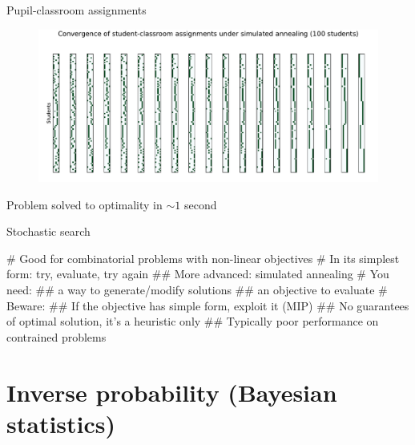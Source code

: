 \documentclass[12pt, aspectratio=149]{beamer}
\theoremstyle{plain}
\begin{document}
\begin{frame}[fragile]{Pupil-classroom assignments}
\vspace*{-1.5em}
\begin{center}
 \begin{figure}
    	\centering
    	\includegraphics[width=0.99\linewidth]{figures/classroom_convergence.pdf}
 \end{figure}
 \end{center}
\vspace*{-2em}
\begin{center}
Problem solved to optimality in $\sim 1$ second
\end{center}
\end{frame}


\begin{frame}[fragile]{Stochastic search}
	\begin{easylist}[itemize]
		# Good for combinatorial problems with non-linear objectives
		# In its simplest form: try, evaluate, try again
		## More advanced: simulated annealing
		# You need: 
		## a way to generate/modify solutions
		## an objective to evaluate
		# Beware:
		## If the objective has simple form, exploit it (MIP)
		## No guarantees of optimal solution, it's a heuristic only
		## Typically poor performance on contrained problems
	\end{easylist}
\end{frame}




\section{Inverse probability (Bayesian statistics)}
\end{document}
